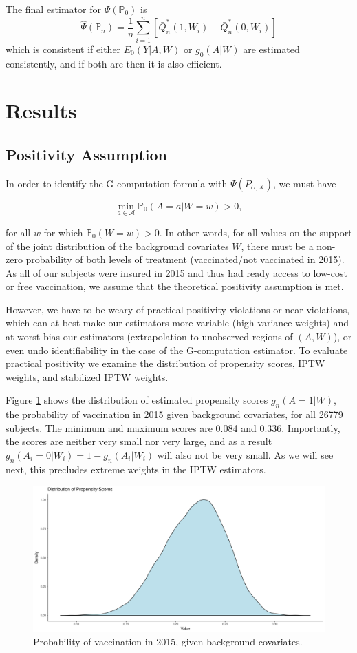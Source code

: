 \documentclass[english, 12pt]{article}
\def\P{\mathbb{P}}
\begin{document}
The final estimator for $\Psi(\P_0)$ is
$$\hat{\Psi}(\P_n) = \frac{1}{n}\sum_{i = 1}^n [\bar{Q}^*_n(1, W_i) - \bar{Q}^*_n(0, W_i)]$$
which is consistent if either $E_0(Y | A, W)$ or $g_0(A|W)$ are estimated consistently, and if both are then it is also efficient.

\section{Results}

\subsection{Positivity Assumption}

In order to identify the G-computation formula with $\Psi(P_{U,X})$, we must have

$$ \min_{a \in \mathcal{A}} \P_0(A = a| W = w) > 0,$$

for all $w$ for which $\P_0(W = w) > 0$. In other words, for all values on the support of the joint distribution of the background covariates $W$, there must be a non-zero probability of both levels of treatment (vaccinated/not vaccinated in 2015). As all of our subjects were insured in 2015 and thus had ready access to low-cost or free vaccination, we assume that the theoretical positivity assumption is met.

However, we have to be weary of practical positivity violations or near violations, which can at best make our estimators more variable (high variance weights) and at worst bias our estimators (extrapolation to unobserved regions of $(A, W)$), or even undo identifiability in the case of the G-computation estimator. To evaluate practical positivity we examine the distribution of propensity scores, IPTW weights, and stabilized IPTW weights.

Figure \ref{fig:propensity} shows the distribution of estimated propensity scores $g_n(A = 1 | W)$, the probability of vaccination in 2015 given background covariates, for all 26779 subjects. The minimum and maximum scores are 0.084 and 0.336. Importantly, the scores are neither very small nor very large, and as a result $g_n(A_i = 0|W_i) = 1 - g_n(A_i|W_i)$ will also not be very small. As we will see next, this precludes extreme weights in the IPTW estimators.

\begin{figure}
    \centering
    \includegraphics[scale=0.5]{figures/propensity.png}
    \caption{Probability of vaccination in 2015, given background covariates.}
    \label{fig:propensity}
\end{figure}
\end{document}
